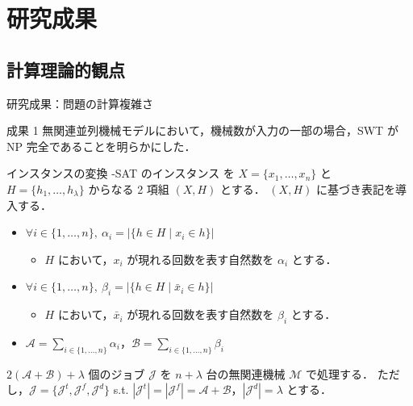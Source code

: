 \documentclass[dvipdfmx]{beamer}
\begin{document}
    \section{研究成果}
    \subsection{計算理論的観点}
    \begin{frame}{研究成果：問題の計算複雑さ}
      \begin{alertblock}{成果 1}
        無関連並列機械モデルにおいて，機械数が入力の一部の場合，SWT が NP 完全であることを明らかにした．
      \end{alertblock}
      \begin{block}{インスタンスの変換}
        {-SAT} のインスタンス を $X = \{x_1,\ldots,x_n\}$ と $H = \{h_1,\ldots,h_{\lambda}\}$ からなる 2 項組 $(X,H)$ とする．
        $(X,H)$ に基づき表記を導入する．
        \begin{itemize}
          \item $\forall i \in \{1,\ldots,n\},~\alpha_i = |\{h \in H \mid x_i \in h\}|$
          \begin{itemize}
            \item $H$ において，$x_i$ が現れる回数を表す自然数を $\alpha_i$ とする．
          \end{itemize}
          \item $\forall i \in \{1,\ldots,n\},~\beta_i = |\{h \in H \mid \bar x_i \in h\}|$
          \begin{itemize}
            \item $H$ において，$\bar x_i$ が現れる回数を表す自然数を $\beta_i$ とする．
          \end{itemize}
          \item $\mathcal{A} = {\displaystyle \sum_{i \in \{1,\ldots,n\}}\alpha_i}$，$\mathcal{B} = {\displaystyle \sum_{i \in \{1,\ldots,n\}}\beta_i}$
        \end{itemize}
      \end{block}
      $2(\mathcal{A} + \mathcal{B}) + \lambda$ 個のジョブ $\mathcal{J}$ を $n + \lambda$ 台の無関連機械 $\mathcal{M}$ で処理する．
      ただし，$\mathcal{J} = \{\mathcal{J}^t,\mathcal{J}^f,\mathcal{J}^d\}$ s.t. $|\mathcal{J}^t| = |\mathcal{J}^f| = \mathcal{A} + \mathcal{B}$，$|\mathcal{J}^d| = \lambda$ とする．
    \end{frame}
\end{document}

